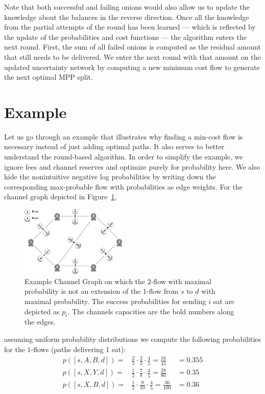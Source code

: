 \documentclass[10pt,twocolumn]{article}
\begin{document}
Note that both successful and failing onions would also allow us to update the knowledge about the balances in the reverse direction.
Once all the knowledge from the partial attempts of the round has been learned --- which is reflected by the update of the probabilities and cost functions --- the algorithm enters the next round.
First, the sum of all failed onions is computed as the residual amount that still needs to be delivered.
We enter the next round with that amount on the updated uncertainty network by computing a new minimum cost flow to generate the next optimal MPP split.


\section{Example}
Let us go through an example that illustrates why finding a min-cost flow is necessary instead of just adding optimal paths.
It also serves to better understand the round-based algorithm.
In order to simplify the example, we ignore fees and channel reserves and optimize purely for probability here.
We also hide the nonintuitive negative log probabilities by writing down the corresponding max-probable flow with probabilities as edge weights.
For the channel graph depicted in Figure~\ref{fig:counterexample},
\begin{figure}[htpb]
  \center
  \includegraphics[width=0.45\textwidth]{img/counterexample.png}
  \caption{Example Channel Graph on which the $2$-flow with maximal probability is not an extension of the $1$-flow from  $s$ to $d$ with maximal probability. The success probabilities for sending $i$ sat are depicted as $p_i$. The channels capacities are the bold numbers along the edges.}
  \label{fig:counterexample}
\end{figure}
assuming uniform probability distributions we compute the following probabilities for the $1$-flows (paths delivering 1 sat):
\[
\begin{aligned}
p([s,A,B,d]) = & \frac{2}{3}\cdot\frac{2}{3}\cdot\frac{4}{5}=\frac{16}{45} &= 0.35\overline{5} \\
p([s,X,Y,d]) = & \frac{1}{2}\cdot\frac{7}{8}\cdot\frac{4}{5}=\frac{28}{80} &= 0.35 \\
p([s,X,B,d]) = & \frac{1}{2}\cdot\frac{9}{10}\cdot\frac{4}{5}=\frac{36}{100} &= 0.36 \\
\end{aligned}
\]
\end{document}
